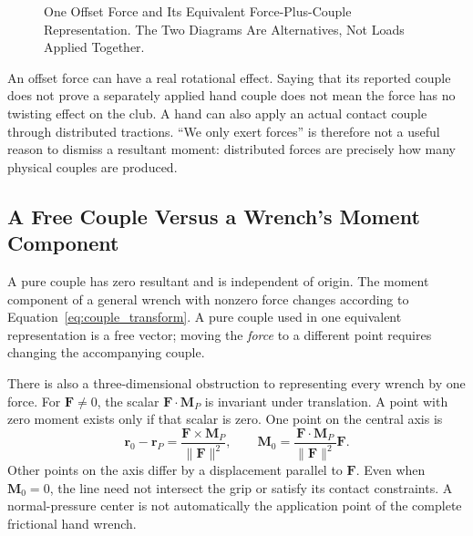 \documentclass[11pt,a4paper]{article}
\newcommand{\vect}[1]{\boldsymbol{#1}}
\begin{document}
\begin{figure}[htbp]\centering
{}
\caption{One Offset Force and Its Equivalent Force-Plus-Couple Representation. The Two Diagrams Are Alternatives, Not Loads Applied Together.}
\label{fig:basic_equivalence}\end{figure}

An offset force can have a real rotational effect. Saying that its reported couple does not prove a separately applied hand couple does not mean the force has no twisting effect on the club. A hand can also apply an actual contact couple through distributed tractions. ``We only exert forces'' is therefore not a useful reason to dismiss a resultant moment: distributed forces are precisely how many physical couples are produced.

\subsection{A Free Couple Versus a Wrench's Moment Component}
A pure couple has zero resultant and is independent of origin. The moment component of a general wrench with nonzero force changes according to Equation~\ref{eq:couple_transform}. A pure couple used in one equivalent representation is a free vector; moving the \emph{force} to a different point requires changing the accompanying couple.

There is also a three-dimensional obstruction to representing every wrench by one force. For $\vect F\ne0$, the scalar $\vect F\cdot\vect M_P$ is invariant under translation. A point with zero moment exists only if that scalar is zero. One point on the central axis is
\begin{equation}
\vect r_0-\vect r_P=\frac{\vect F\times\vect M_P}{\|\vect F\|^2},
\qquad
\vect M_0=\frac{\vect F\cdot\vect M_P}{\|\vect F\|^2}\vect F.
\end{equation}
Other points on the axis differ by a displacement parallel to $\vect F$. Even when $\vect M_0=0$, the line need not intersect the grip or satisfy its contact constraints. A normal-pressure center is not automatically the application point of the complete frictional hand wrench.
\end{document}
